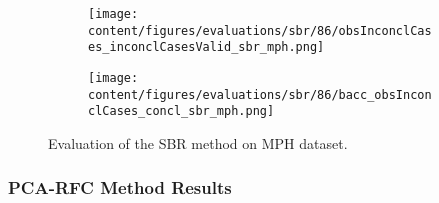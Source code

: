 \begin{figure}[ht]
  \begin{subfigure}{0.9\textwidth}
    \centering
    \texttt{[image: content/figures/evaluations/sbr/86/obsInconclCases\_inconclCasesValid\_sbr\_mph.png]}
    \label{fig:obsInconclCases_inconclCasesValid_sbr_mph}
  \end{subfigure}
  \hfill
  \begin{subfigure}{0.9\textwidth}
    \centering
    \texttt{[image: content/figures/evaluations/sbr/86/bacc\_obsInconclCases\_concl\_sbr\_mph.png]}
    \label{fig:bacc_obsInconclCases_concl_sbr_mph}
  \end{subfigure}
  \caption{Evaluation of the SBR method on MPH dataset.}
  \label{fig:perf_results_sbr_mph}
\end{figure}




\subsubsection{PCA-RFC Method Results}
\label{subsubsec:eval_rfc}




